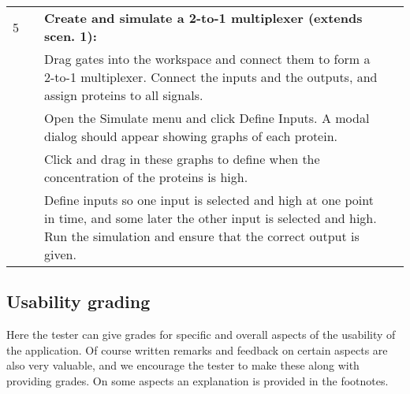 \documentclass{article}
\newcounter{step}
\newcommand{\step}{\arabic{step}\stepcounter{step}}
\begin{document}
\begin{center}
\begin{longtable}{r r  p{} l }
5 &\setcounter{step}{1}& \textbf{Create and simulate a 2-to-1 multiplexer (extends scen. 1):}\\
&\step& Drag gates into the workspace and connect them to form a 2-to-1 multiplexer. Connect the inputs and the outputs, and assign proteins to all signals.\\
&\step& Open the Simulate menu and click Define Inputs. A modal dialog should appear showing graphs of each protein.\\
&\step& Click and drag in these graphs to define when the concentration of the proteins is high.\\
&\step& Define inputs so one input is selected and high at one point in time, and some later the other input is selected and high. Run the simulation and ensure that the correct output is given. \\

\end{longtable}
\end{center}

\newpage
\subsection{Usability grading}
Here the tester can give grades for specific and overall aspects of the usability of the application. Of course written remarks and feedback on certain aspects are also very valuable, and we encourage the tester to make these along with providing grades. On some aspects an explanation is provided in the footnotes.
\end{document}
